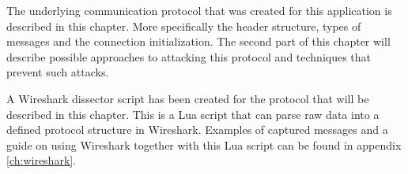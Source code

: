 The underlying communication protocol that was created for this application is described in this chapter. More specifically the header structure, types of messages and the connection initialization. The second part of this chapter will describe possible approaches to attacking this protocol and techniques that prevent such attacks.

A Wireshark dissector script has been created for the protocol that will be described in this chapter. This is a Lua script that can parse raw data into a defined protocol structure in Wireshark. Examples of captured messages and a guide on using Wireshark together with this Lua script can be found in appendix \ref{ch:wireshark}.
